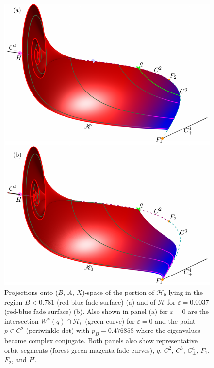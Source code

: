 \documentclass{ws-ijbc}
\begin{document}
\begin{figure}[H]
\centering
\includegraphics[]{./figures/MKMO_13.pdf}
\caption{Projections onto ($B$, $A$, $X$)-space of the portion of $\mathscr{H}_0$ lying in the region $B < 0.781$ (red-blue fade surface) (a) and of $\mathscr{H}$ for $\varepsilon=0.0037$ (red-blue fade surface) (b).   Also shown in panel (a) for $\varepsilon=0$ are the intersection $W^u(q)\cap\mathscr{H}_0$ (green curve) for $\varepsilon=0$ and the point $p \in C^2$ (periwinkle dot) with $p_B=0.476858$ where the eigenvalues become complex conjugate.    Both panels also show representative orbit segments (forest green-magenta fade curves), $q$, $C^2$, $C^3$, $C^4_\pm$, $F_1$, $F_2$, and $H$.}
\label{figure_13}
\end{figure}
\end{document}
